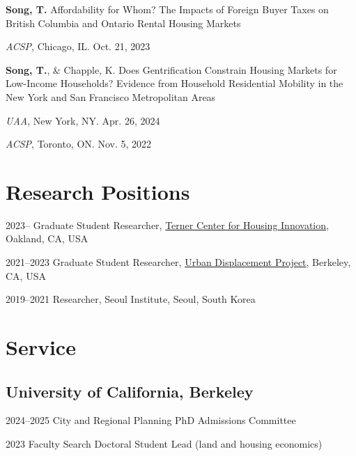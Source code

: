 \documentclass[11pt,letterpaper]{article}
\begin{document}
\begin{subpoints}
  \item \textbf{Song, T.} Affordability for Whom? The Impacts of Foreign Buyer Taxes on British Columbia and Ontario Rental Housing Markets
    \begin{subpoints2}
      \item \emph{ACSP}, Chicago, IL. Oct. 21, 2023
    \end{subpoints2}

  \item \textbf{Song, T.}, \& Chapple, K. Does Gentrification Constrain Housing Markets for Low-Income Households? Evidence from Household Residential Mobility in the New York and San Francisco Metropolitan Areas
    \begin{subpoints2}
      \item \emph{UAA}, New York, NY. Apr. 26, 2024
      \item \emph{ACSP}, Toronto, ON. Nov. 5, 2022
    \end{subpoints2}
\end{subpoints}

\section{Research Positions}
\begin{tablist}
  \item[2023– ] \tab{}Graduate Student Researcher, \href{https://ternercenter.berkeley.edu/}{Terner Center for Housing Innovation}, Oakland, CA, USA
  \item[2021–2023] \tab{}Graduate Student Researcher, \href{https://www.urbandisplacement.org/}{Urban Displacement Project}, Berkeley, CA, USA
  \item[2019–2021] \tab{}Researcher, Seoul Institute, Seoul, South Korea
\end{tablist}

\section{Service}

\subsection{University of California, Berkeley}
\begin{tablist}
  \item[2024–2025] \tab{}City and Regional Planning PhD Admissions Committee
  \item[2023] \tab{}Faculty Search Doctoral Student Lead (land and housing economics)
\end{tablist}
\end{document}
